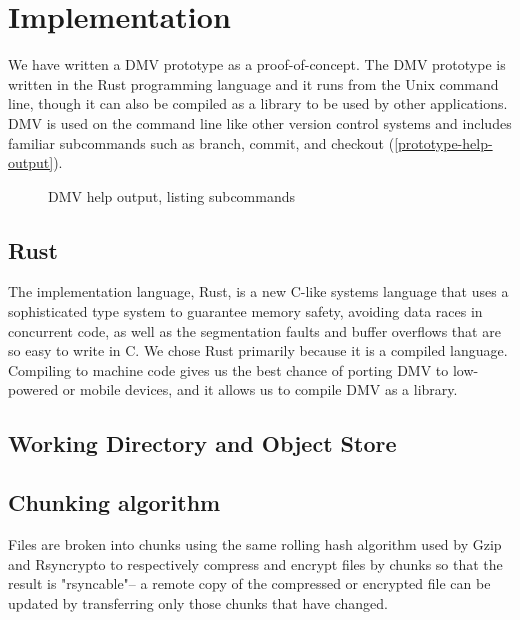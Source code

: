 \chapter{Implementation}

We have written a DMV prototype as a proof-of-concept. The DMV prototype is
written in the Rust programming language and it runs from the Unix command line,
though it can also be compiled as a library to be used by other applications.
DMV is used on the command line like other version control systems and includes
familiar subcommands such as branch, commit, and checkout
(\autoref{prototype-help-output}).

\begin{figure}[h]
    \caption{DMV help output, listing subcommands}
    \label{prototype-help-output}
    
\end{figure}



\section{Rust}

The implementation language, Rust, is a new C-like systems language that uses a
sophisticated type system to guarantee memory safety,
avoiding data races in concurrent code, as well as the segmentation faults and
buffer overflows that are so easy to write in C. We chose Rust primarily because
it is a compiled language. Compiling to machine code gives us the best chance of
porting DMV to low-powered or mobile devices, and it allows us to compile DMV as
a library.



\section{Working Directory and Object Store}




\section{Chunking algorithm}

Files are broken into chunks using the same rolling hash algorithm used by Gzip
and Rsyncrypto\cite{rsyncrypto_algorithm} to respectively compress and encrypt
files by chunks so that the result is "rsyncable"-- a remote copy of the
compressed or encrypted file can be updated by transferring only those chunks
that have changed.

